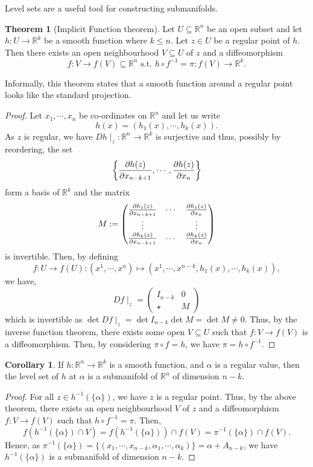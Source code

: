 \documentclass[]{article}
\theoremstyle{definition}
\newtheorem{theorem}{Theorem}
\newtheorem{corollary}{Corollary}[theorem]
\theoremstyle{definition}
\begin{document}
Level sets are a useful tool for constructing submanifolds.

\begin{theorem}[Implicit Function theorem]
  Let \(U \subseteq \mathbb{R}^n\) be an open subset and let 
  \(h : U \to \mathbb{R}^k\) be a smooth function where \(k \le n\). Let 
  \(z \in U\) be a regular point of \(h\). Then there exists an open 
  neighbourhood \(V \subseteq U\) of \(z\) and a diffeomorphism 
  \[f : V \to f(V) \subseteq \mathbb{R}^n \text{ s.t. } 
    h \circ f^{-1} = \pi : f(V) \to \mathbb{R}^k.\]
\end{theorem}

Informally, this theorem states that a smooth function around a regular point 
looks like the standard projection.

\begin{proof}
  Let \(x_1, \cdots, x_n\) be co-ordinates on \(\mathbb{R}^n\) and let 
  us write 
  \[h(x) = (h_1(x), \cdots, h_k(x)).\] 
  As \(z\) is regular, we have \(Dh\mid_z : \mathbb{R}^n \to \mathbb{R}^k\) is 
  surjective and thus, possibly by reordering, the set 
  \[\left\{\pdv{h(z)}{x_{n-k+1}}, \cdots, \pdv{h(z)}{x_n}\right\}\]
  form a basis of \(\mathbb{R}^k\) and the matrix 
  \[M := \begin{pmatrix}
    \pdv{h_1(z)}{x_{n-k+1}} & \cdots & \pdv{h_1(z)}{x_n} \\
    \vdots & & \vdots \\
    \pdv{h_k(z)}{x_{n-k+1}} & \cdots & \pdv{h_k(z)}{x_n}
  \end{pmatrix}\]
  is invertible. Then, by defining 
  \[f : U \to f(U) : (x^1, \cdots, x^n) \mapsto 
    (x^1, \cdots, x^{n - k}, h_1(x), \cdots, h_k(x)),\]
  we have, 
  \[Df\mid_z = 
  \left(\begin{array}{c|c}
    I_{n - k} & 0\\
    \hline
    \star & M
  \end{array}\right)\]
  which is invertible as \(\det Df\mid_z = \det I_{n-k} \det M = \det M \neq 0\).
  Thus, by the inverse function theorem, there exists some open \(V \subseteq U\) 
  such that \(f : V \to f(V)\) is a diffeomorphism. Then, by considering 
  \(\pi \circ f = h\), we have \(\pi = h \circ f^{-1}\).
\end{proof}

\begin{corollary}
  If \(h : \mathbb{R}^n \to \mathbb{R}^k\) is a smooth function, and \(\alpha\) 
  is a regular value, then the level set of \(h\) at \(\alpha\) is a submanifold 
  of \(\mathbb{R}^n\) of dimension \(n - k\).
\end{corollary}
\begin{proof}
  For all \(z \in h^{-1}(\{\alpha\})\), we have \(z\) is a regular point. Thus, 
  by the above theorem, there exists an open neighbourhood \(V\) of \(z\) and a 
  diffeomorphism \(f : V \to f(V)\) such that \(h \circ f^{-1} = \pi\). Then, 
  \[f(h^{-1}(\{\alpha\}) \cap V) = f(h^{-1}(\{\alpha\})) \cap f(V) = 
    \pi^{-1}(\{\alpha\}) \cap f(V).\]
  Hence, as \(\pi^{-1}(\{\alpha\}) = 
  \{(x_1, \cdots, x_{n - k}, \alpha_1, \cdots, \alpha_k)\} = \alpha + A_{n - k}\),
  we have \(h^{-1}(\{\alpha\})\) is a submanifold of dimension \(n - k\).
\end{proof}
\end{document}
